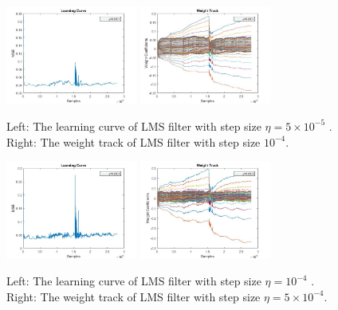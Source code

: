 \documentclass[conference]{IEEEtran}
\begin{document}
	\begin{figure}[htbp]
	\centering
	\includegraphics[width = 1.7in]{LMS_LC_eta2.jpg}
	\includegraphics[width=1.7in]{LMS_WT_5.jpg}
	\caption{Left: The learning curve of LMS filter with step size $\eta = 5\times 10^{-5}$ . Right: The weight track of LMS filter with step size $10^{-4}$.}
	\label{LMSeta4}
	\end{figure}

	\begin{figure}[htbp]
	\centering
	\includegraphics[width = 1.7in]{LMS_LC_eta3.jpg}
	\includegraphics[width=1.7in]{LMS_WT_4.jpg}
	\caption{Left: The learning curve of LMS filter with step size $\eta = 10^{-4}$ . Right: The weight track of LMS filter with step size $\eta =  5\times 10^{-4}$.}
	\label{LMSeta5}
	\end{figure}
\end{document}
